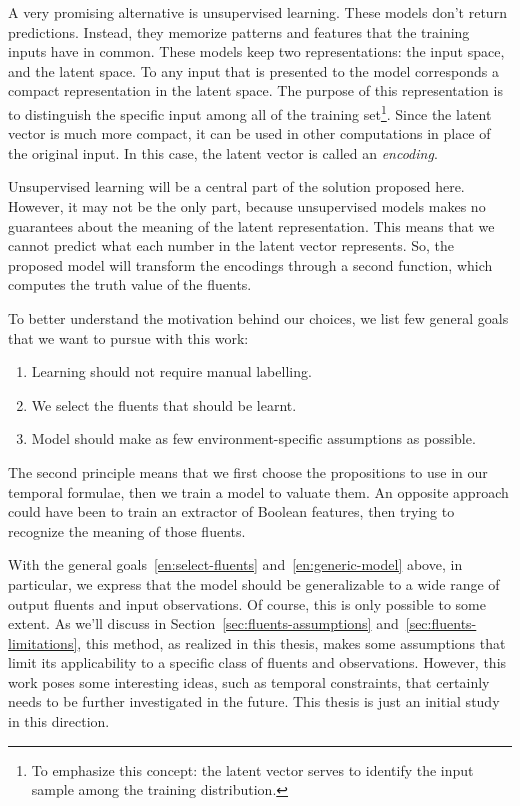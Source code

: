 A very promising alternative is unsupervised learning. These models don't
return predictions. Instead, they memorize patterns and features that the
training inputs have in common. These models keep two representations: the
input space, and the latent space. To any input that is presented to the
model corresponds a compact representation in the latent space. The purpose
of this representation is to distinguish the specific input among all of the
training set\footnote{To emphasize this concept: the latent vector serves to
identify the input sample among the training distribution.}. Since the latent
vector is much more compact, it can be used in other computations in place of
the original input. In this case, the latent vector is called an
\emph{encoding}.

Unsupervised learning will be a central part of the solution proposed here.
However, it may not be the only part, because unsupervised models makes no
guarantees about the meaning of the latent representation. This means that
we cannot predict what each number in the latent vector represents. So, the
proposed model will transform the encodings through a second function, which
computes the truth value of the fluents.

To better understand the motivation behind our choices, we list few general
goals that we want to pursue with this work:
\begin{enumerate}
	\item Learning should not require manual labelling.
	\item \label{en:select-fluents} We select the fluents that should be learnt.
	\item \label{en:generic-model} Model should make as few environment-specific
		assumptions as possible.
\end{enumerate}
The second principle means that we first choose the propositions to use in our
temporal formulae, then we train a model to valuate them. An opposite approach
could have been to train an extractor of Boolean features, then trying to
recognize the meaning of those fluents.

With the general goals~\ref{en:select-fluents} and~\ref{en:generic-model}
above, in particular, we express that the model should be generalizable to a
wide range of output fluents and input observations. Of course, this is only
possible to some extent. As we'll discuss in
Section~\ref{sec:fluents-assumptions} and~\ref{sec:fluents-limitations}, this
method, as realized in this thesis, makes some assumptions that limit its
applicability to a specific class of fluents and observations. However, this
work poses some interesting ideas, such as temporal constraints, that
certainly needs to be further investigated in the future. This thesis is just
an initial study in this direction.


